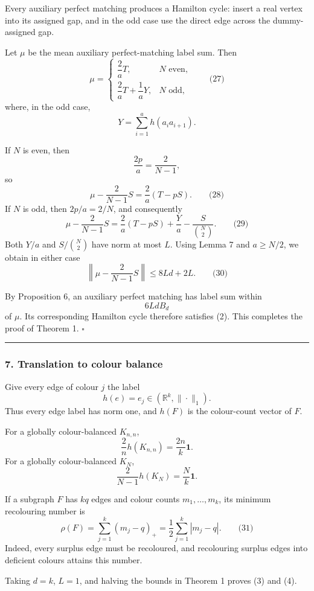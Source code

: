 \documentclass[
  11pt,
  a4paper,
]{article}
\begin{document}
Every auxiliary perfect matching produces a Hamilton cycle: insert a
real vertex into its assigned gap, and in the odd case use the direct
edge across the dummy-assigned gap.

Let \(\mu\) be the mean auxiliary perfect-matching label sum. Then \[
\mu=
\begin{cases}
\dfrac2a T,&N\text{ even},\\[7pt]
\dfrac2a T+\dfrac1aY,&N\text{ odd},
\end{cases}
\qquad\text{(27)}
\] where, in the odd case, \[
Y=\sum_{i=1}^a h(a_i a_{i+1}).
\]

If \(N\) is even, then \[
\frac{2p}{a}=\frac2{N-1},
\] so \[
\mu-\frac2{N-1}S=\frac2a(T-pS).
\qquad\text{(28)}
\] If \(N\) is odd, then \(2p/a=2/N\), and consequently \[
\mu-\frac2{N-1}S
=
\frac2a(T-pS)
+\frac Ya-\frac{S}{\binom N2}.
\qquad\text{(29)}
\] Both \(Y/a\) and \(S/\binom N2\) have norm at most \(L\). Using Lemma
7 and \(a\ge N/2\), we obtain in either case \[
\left\|\mu-\frac2{N-1}S\right\|
\le 8Ld+2L.
\qquad\text{(30)}
\]

By Proposition 6, an auxiliary perfect matching has label sum within \[
6LdB_d
\] of \(\mu\). Its corresponding Hamilton cycle therefore satisfies (2).
This completes the proof of Theorem 1. \(\square\)

\begin{center}\rule{0.5\linewidth}{0.5pt}\end{center}

\subsubsection{7. Translation to colour
balance}\label{translation-to-colour-balance}

Give every edge of colour \(j\) the label \[
h(e)=e_j\in(\mathbb R^k,\|\cdot\|_1).
\] Thus every edge label has norm one, and \(h(F)\) is the colour-count
vector of \(F\).

For a globally colour-balanced \(K_{n,n}\), \[
\frac2n h(K_{n,n})=\frac{2n}{k}\mathbf1.
\] For a globally colour-balanced \(K_N\), \[
\frac2{N-1}h(K_N)=\frac Nk\mathbf1.
\]

If a subgraph \(F\) has \(kq\) edges and colour counts
\(m_1,\ldots,m_k\), its minimum recolouring number is \[
\rho(F)
=\sum_{j=1}^k(m_j-q)_+
=\frac12\sum_{j=1}^k|m_j-q|.
\qquad\text{(31)}
\] Indeed, every surplus edge must be recoloured, and recolouring
surplus edges into deficient colours attains this number.

Taking \(d=k\), \(L=1\), and halving the bounds in Theorem 1 proves (3)
and (4).
\end{document}
